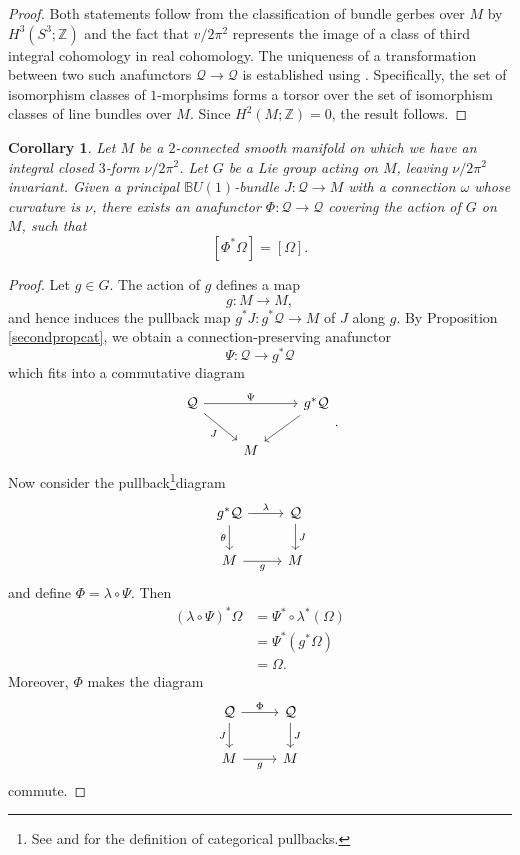 \documentclass{article}
\theoremstyle{plain}
\newtheorem{cor}[thm]{Corollary}
\theoremstyle{definition}
\begin{document}
\begin{proof}
Both statements follow from the classification of bundle gerbes over $M$ by $H^3(S^3;\mathbb{Z})$ and the fact that $v/2\pi^2$ represents the image of a class of third integral cohomology in real cohomology. The uniqueness of a transformation between two such anafunctors $\mathcal{Q} \longrightarrow \mathcal{Q}$ is established using \cite[Corollary 2.3 on page 263]{MR2318389}. Specifically, the set of isomorphism classes of $1$-morphsims forms a torsor over the set of isomorphism classes of line bundles over $M$. Since $H^2(M;\mathbb{Z}) = 0$, the result follows.
\end{proof}
\begin{cor}\label{corsecondpropcat}
Let $M$ be a $2$-connected smooth manifold on which we have an integral closed $3$-form $\nu/{2\pi^2}$. Let $G$ be a Lie group acting on $M$, leaving $\nu/{2\pi^2}$ invariant. Given a principal $\mathbb{B}U(1)$-bundle $J:\mathcal{Q} \longrightarrow M$ with a connection $\omega$ whose curvature is $\nu$, there exists an anafunctor $\Phi:\mathcal{Q} \longrightarrow \mathcal{Q}$ covering the action of $G$ on $M$, such that $$[\Phi^\ast\Omega] = [\Omega].$$
\end{cor}
\begin{proof}
Let $g \in G$. The action of $g$ defines a map
\[
g:M \longrightarrow M,
\]
and hence induces the pullback map $g^\ast J:g^\ast \mathcal{Q} \longrightarrow M$ of $J$ along $g$. By Proposition \ref{secondpropcat}, we obtain a connection-preserving anafunctor
\[
\Psi:\mathcal{Q} \longrightarrow g^\ast \mathcal{Q}
\]
which fits into a commutative diagram
\[
\begin{tikzcd}
\mathcal{Q} \arrow[dr,"J"'] \arrow[rr,"\Psi"] & & g^\ast \mathcal{Q} \arrow[dl] \\
& M &
\end{tikzcd}.
\]
Now consider the pullback\footnote{See \cite[page 54]{MR2709030} and \cite[page 258]{MR2318389} for the definition of categorical pullbacks.}diagram
\[
\begin{tikzcd}
g^\ast \mathcal{Q} \arrow[r,"\lambda"] \arrow[d,"\theta"'] & \mathcal{Q} \arrow[d,"J"] \\
M \arrow[r,"g"'] & M
\end{tikzcd}
\]
and define $\Phi = \lambda \circ \Psi$. Then
\begin{align*}
(\lambda \circ \Psi)^\ast \Omega & = \Psi^\ast \circ \lambda^\ast (\Omega) \\
& = \Psi^\ast (g^\ast \Omega) \\
& = \Omega.
\end{align*}
Moreover, $\Phi$ makes the diagram
\[
\begin{tikzcd}
\mathcal{Q} \arrow[d,"J"'] \arrow[r,"\Phi"] & \mathcal{Q} \arrow[d,"J"] \\
M \arrow[r,"g"'] & M
\end{tikzcd}
\]
commute.
\end{proof}
\end{document}
